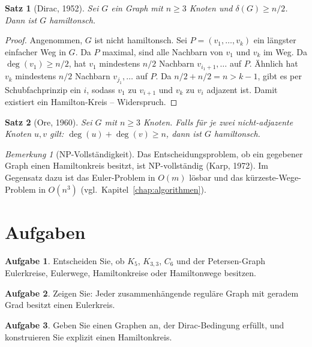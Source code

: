 ﻿\documentclass[a4paper,12pt,openany,oneside]{book}
\theoremstyle{definition}
\newtheorem{aufgabe}{Aufgabe}[chapter]
\theoremstyle{plain}
\newtheorem{satz}{Satz}[chapter]
\theoremstyle{remark}
\newtheorem{bemerkung}{Bemerkung}[chapter]
\begin{document}
\begin{satz}[Dirac, 1952]
  Sei $G$ ein Graph mit $n \geq 3$ Knoten und $\delta(G) \geq n/2$. Dann
  ist $G$ hamiltonsch.
\end{satz}

\begin{proof}
  Angenommen, $G$ ist nicht hamiltonsch. Sei $P = (v_1, \ldots, v_k)$
  ein l\"angster einfacher Weg in $G$. Da $P$ maximal, sind alle Nachbarn
  von $v_1$ und $v_k$ im Weg. Da $\deg(v_1) \geq n/2$, hat $v_1$ mindestens
  $n/2$ Nachbarn $v_{i_1+1}, \ldots$ auf $P$. \"Ahnlich hat $v_k$ mindestens
  $n/2$ Nachbarn $v_{j_1}, \ldots$ auf $P$. Da $n/2 + n/2 = n > k-1$, gibt
  es per Schubfachprinzip ein $i$, sodass $v_1$ zu $v_{i+1}$ und $v_k$ zu
  $v_i$ adjazent ist. Damit existiert ein Hamilton-Kreis -- Widerspruch.
\end{proof}

\begin{satz}[Ore, 1960]
  Sei $G$ mit $n \geq 3$ Knoten. Falls f\"ur je zwei nicht-adjazente Knoten
  $u, v$ gilt: $\deg(u) + \deg(v) \geq n$, dann ist $G$ hamiltonsch.
\end{satz}

\begin{bemerkung}[NP-Vollst\"andigkeit]
  Das Entscheidungsproblem, ob ein gegebener Graph einen Hamiltonkreis
  besitzt, ist NP-vollst\"andig (Karp, 1972). Im Gegensatz dazu ist das
  Euler-Problem in $O(m)$ l\"osbar und das k\"urzeste-Wege-Problem in
  $O(n^3)$ (vgl.~Kapitel~\ref{chap:algorithmen}).
\end{bemerkung}

\section{Aufgaben}

\begin{aufgabe}
  Entscheiden Sie, ob $K_5$, $K_{3,3}$, $C_6$ und der Petersen-Graph
  Eulerkreise, Eulerwege, Hamiltonkreise oder Hamiltonwege besitzen.
\end{aufgabe}

\begin{aufgabe}
  Zeigen Sie: Jeder zusammenh\"angende regul\"are Graph mit geradem Grad
  besitzt einen Eulerkreis.
\end{aufgabe}

\begin{aufgabe}
  Geben Sie einen Graphen an, der Dirac-Bedingung erf\"ullt, und
  konstruieren Sie explizit einen Hamiltonkreis.
\end{aufgabe}
\end{document}
